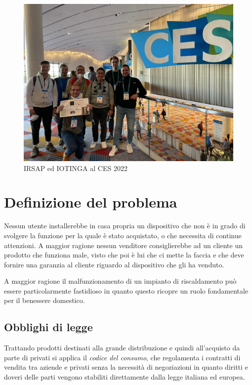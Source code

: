 \documentclass[12pt,a4paper,twoside,titlepage]{book}
\begin{document}
\begin{figure}[ht]
    \centering
    \includegraphics[width=12cm]{img/ces.jpeg}
    \caption{IRSAP ed IOTINGA al CES 2022}
    \label{fig:ces}
\end{figure}

\chapter{Definizione del problema}

Nessun utente installerebbe in casa propria un dispositivo che non è in grado di svolgere la funzione 
per la quale è stato acquistato, o che necessita di continue attenzioni.
A maggior ragione nessun venditore consiglierebbe ad un cliente un prodotto che funziona male, 
visto che poi è lui che ci mette la faccia e che deve fornire una garanzia al cliente riguardo 
al dispositivo che gli ha venduto. 

A maggior ragione il malfunzionamento di un impianto di riscaldamento può essere particolarmente 
fastidioso in quanto questo ricopre un ruolo fondamentale per il benessere domestico.

\section{Obblighi di legge}

Trattando prodotti destinati alla grande distribuzione e quindi all'acquisto da parte 
di privati si applica il \textit{codice del consumo}, che regolamenta i contratti di vendita
tra aziende e privati senza la necessità di negoziazioni in quanto diritti e doveri delle parti 
vengono stabiliti direttamente dalla legge italiana ed europea.
\end{document}
